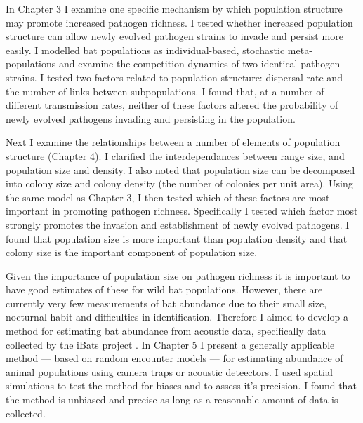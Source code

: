 
In Chapter 3 I examine one specific mechanism by which population structure may promote increased pathogen richness.
I tested whether increased population structure can allow newly evolved pathogen strains to invade and persist more easily.
I modelled bat populations as individual-based, stochastic meta-populations and examine the competition dynamics of two identical pathogen strains.
I tested two factors related to population structure: dispersal rate and the number of links between subpopulations.
I found that, at a number of different transmission rates, neither of these factors altered the probability of newly evolved pathogens invading and persisting in the population.


Next I examine the relationships between a number of elements of population structure (Chapter 4).
I clarified the interdependances between range size, and population size and density.
I also noted that population size can be decomposed into colony size and colony density (the number of colonies per unit area).
Using the same model as Chapter 3, I then tested which of these factors are most important in promoting pathogen richness.
Specifically I tested which factor most strongly promotes the invasion and establishment of newly evolved pathogens.
I found that population size is more important than population density and that colony size is the important component of population size.


Given the importance of population size on pathogen richness it is important to have good estimates of these for wild bat populations.
However, there are currently very few measurements of bat abundance due to their small size, nocturnal habit and difficulties in identification.
Therefore I aimed to develop a method for estimating bat abundance from acoustic data, specifically data collected by the iBats project \cite{jones2011indicator}.
In Chapter 5 I present a generally applicable method --- based on random encounter models \cite{rowcliffe2008estimating, yapp1956theory} --- for estimating abundance of animal populations using camera traps or acoustic deteectors.
I used spatial simulations to test the method for biases and to assess it's precision.
I found that the method is unbiased and precise as long as a reasonable amount of data is collected.















